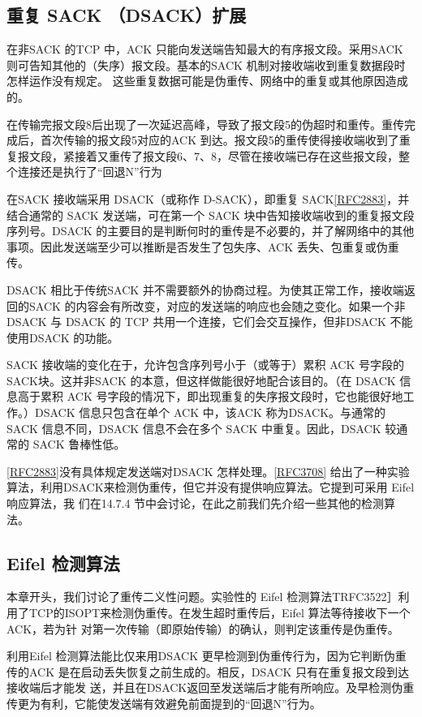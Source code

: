 \subsection{重复 SACK （DSACK）扩展}
在非SACK 的TCP 中，ACK 只能向发送端告知最大的有序报文段。采用SACK 则可告知其他的（失序）报文段。基本的SACK
机制对接收端收到重复数据段时怎样运作没有规定。
这些重复数据可能是伪重传、网络中的重复或其他原因造成的。

在传输完报文段8后出现了一次延迟高峰，导致了报文段5的伪超时和重传。重传完成后，首次传输的报文段5对应的ACK
到达。报文段5的重传使得接收端收到了重复报文段，紧接着又重传了报文段6、7、8，尽管在接收端已存在这些报文段，整个连接还是执行了“回退N”行为

在SACK 接收端采用 DSACK（或称作 D-SACK），即重复
SACK\href{https://www.rfc-editor.org/rfc/rfc2883}{[RFC2883]}，并结合通常的
SACK 发送端，可在第一个 SACK 块中告知接收端收到的重复报文段序列号。DSACK
的主要目的是判断何时的重传是不必要的，并了解网络中的其他事项。因此发送端至少可以推断是否发生了包失序、ACK 丢失、包重复或伪重传。

DSACK 相比于传统SACK 并不需要额外的协商过程。为使其正常工作，接收端返回的SACK
的内容会有所改变，对应的发送端的响应也会随之变化。如果一个非 DSACK 与
DSACK 的 TCP 共用一个连接，它们会交互操作，但非DSACK 不能使用DSACK 的功能。

SACK 接收端的变化在于，允许包含序列号小于（或等于）累积 ACK 号字段的SACK块。这并非SACK
的本意，但这样做能很好地配合该目的。（在 DSACK 信息高于累积 ACK
号字段的情况下，即出现重复的失序报文段时，它也能很好地工作。）DSACK 信息只包含在单个 ACK 中，该ACK
称为DSACK。与通常的SACK 信息不同，DSACK 信息不会在多个
SACK 中重复。因此，DSACK 较通常的 SACK 鲁棒性低。

\href{https://www.rfc-editor.org/rfc/rfc2883}{[RFC2883]}没有具体规定发送端对DSACK
怎样处理。\href{https://www.rfc-editor.org/rfc/rfc3708}{[RFC3708]}
给出了一种实验算法，利用DSACK来检测伪重传，但它并没有提供响应算法。它提到可采用 Eifel 响应算法，我
们在14.7.4 节中会讨论，在此之前我们先介绍一些其他的检测算法。

\subsection{Eifel 检测算法}
本章开头，我们讨论了重传二义性问题。实验性的 Eifel
检测算法TRFC3522］利用了TCP的ISOPT来检测伪重传。在发生超时重传后，Eifel 算法等待接收下一个ACK，若为针
对第一次传输（即原始传输）的确认，则判定该重传是伪重传。

利用Eifel 检测算法能比仅来用DSACK 更早检测到伪重传行为，因为它判断伪重传的ACK 是在启动丢失恢复之前生成的。相反，DSACK
只有在重复报文段到达接收端后才能发
送，并且在DSACK返回至发送端后才能有所响应。及早检测伪重传更为有利，它能使发送端有效避免前面提到的“回退N”行为。

